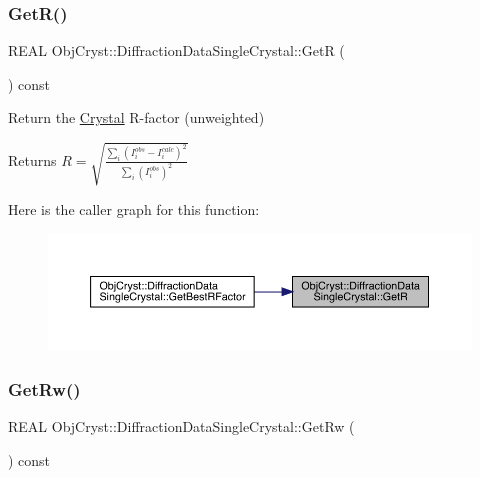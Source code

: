 \subsubsection{\texorpdfstring{GetR()}{GetR()}}
{\footnotesize\ttfamily R\+E\+AL Obj\+Cryst\+::\+Diffraction\+Data\+Single\+Crystal\+::\+GetR (\begin{DoxyParamCaption}{ }\end{DoxyParamCaption}) const\hspace{0.3cm}{\ttfamily [virtual]}}



Return the \mbox{\hyperlink{class_obj_cryst_1_1_crystal}{Crystal}} R-\/factor (unweighted) 

\begin{DoxyReturn}{Returns}
$ R= \sqrt {\frac{\sum_i \left( I_i^{obs}-I_i^{calc} \right)^2} {\sum_i (I_i^{obs})^2} }$ 
\end{DoxyReturn}
Here is the caller graph for this function\+:
\nopagebreak
\begin{figure}[H]
\begin{center}
\leavevmode
\includegraphics[width=350pt]{class_obj_cryst_1_1_diffraction_data_single_crystal_add61e41d60f231d38bcdf9244339ab78_icgraph}
\end{center}
\end{figure}
\mbox{\label{class_obj_cryst_1_1_diffraction_data_single_crystal_a7eb4bb7f2c42ba1be86010c666d11b97}} 
\subsubsection{\texorpdfstring{GetRw()}{GetRw()}}
{\footnotesize\ttfamily R\+E\+AL Obj\+Cryst\+::\+Diffraction\+Data\+Single\+Crystal\+::\+Get\+Rw (\begin{DoxyParamCaption}{ }\end{DoxyParamCaption}) const\hspace{0.3cm}{\ttfamily [virtual]}}



